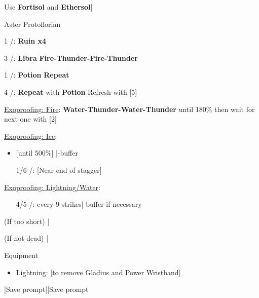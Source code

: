 \begin{mainlist}
	\item Use \textbf{Fortisol} and \textbf{Ethersol}|\skip
\end{mainlist}
\begin{fight}{Aster Protoflorian}
	\item [1] \com/\rav: \textbf{Ruin x4}
	\item [3] \rav/\syn: \textbf{Libra} \to \textbf{Fire-Thunder-Fire-Thunder}
	\item [1] \com/\rav: \textbf{\textbf{Potion}} \to \textbf{Repeat}
	\item [4] \rav/\rav: \textbf{Repeat} with \textbf{Potion} \to Refresh with [5]
	\item \underline{Exoproofing: Fire}: \textbf{Water-Thunder-Water-Thunder} until 180\% then wait for next one with [2]
	\item \underline{Exoproofing: Ice}:
	\begin{itemize}
		\item {}[until 500\%] |\com-buffer
		\item [1/6] \com/\rav: \to{}[Near end of stagger]\to{}\to{}
	\end{itemize}
	\item \underline{Exoproofing: Lightning/Water}:
	\begin{itemize}
		\item [4/5] \rav/\rav: \to{} every 9 strikes|\com-buffer if necessary
	\end{itemize}
	\item (If too short) \to{}\to{}|\skip
	\item (If not dead) |\skip
\end{fight}
\begin{menu}
	\item Equipment
	\begin{itemize}
		\item Lightning: [to remove Gladius and Power Wristband]
	\end{itemize}
\end{menu}
\begin{mainlist}
	\item \skip|Save prompt||Save prompt
\end{mainlist}
